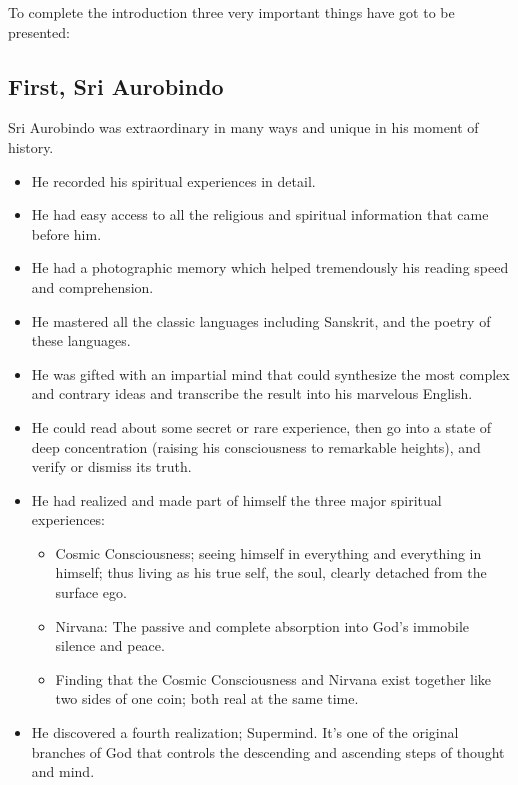 \documentclass[12pt,a4paper]{book}
\begin{document}
To complete the introduction three very important things have got to
be presented:

\subsection*{First, Sri Aurobindo}

Sri Aurobindo was extraordinary in many ways and unique in his moment
of history.

\begin{itemize}
\renewcommand{\labelitemi}{$\diamond$}

\item He recorded his spiritual experiences in detail.

\item He had easy access to all the religious and spiritual
  information that came before him.

\item He had a photographic memory which helped tremendously his
  reading speed and comprehension.

\item He mastered all the classic languages including Sanskrit, and
  the poetry of these languages.

\item He was gifted with an impartial mind that could synthesize the
  most complex and contrary ideas and transcribe the result into his
  marvelous English.

\item He could read about some secret or rare experience, then go into
  a state of deep concentration (raising his consciousness to
  remarkable heights), and verify or dismiss its truth.

\item He had realized and made part of himself the three major
  spiritual experiences:

\begin{itemize}

\item Cosmic Consciousness; seeing himself in everything and
  everything in himself; thus living as his true self, the soul,
  clearly detached from the surface ego.

\item Nirvana: The passive and complete absorption into God's immobile
  silence and peace.

\item Finding that the Cosmic Consciousness and Nirvana exist together
  like two sides of one coin; both real at the same time.
\end{itemize}

\item He discovered a fourth realization; Supermind. It's one of the
  original branches of God that controls the descending and ascending
  steps of thought and mind.
\end{itemize}
\end{document}
